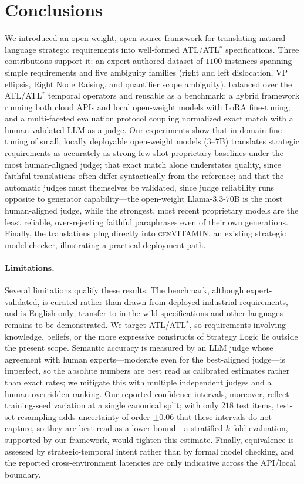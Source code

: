 \section{Conclusions}
\label{sec:conclusions}

We introduced an open-weight, open-source framework for translating natural-language strategic requirements into well-formed ATL/ATL$^\ast$ specifications. Three contributions support it: an expert-authored dataset of $1100$ instances spanning simple requirements and five ambiguity families (right and left dislocation, VP ellipsis, Right Node Raising, and quantifier scope ambiguity), balanced over the ATL/ATL$^\ast$ temporal operators and reusable as a benchmark; a hybrid framework running both cloud APIs and local open-weight models with LoRA fine-tuning; and a multi-faceted evaluation protocol coupling normalized exact match with a human-validated LLM-as-a-judge. Our experiments show that in-domain fine-tuning of small, locally deployable open-weight models ($3$--$7$B) translates strategic requirements as accurately as strong few-shot proprietary baselines under the most human-aligned judge; that exact match alone understates quality, since faithful translations often differ syntactically from the reference; and that the automatic judges must themselves be validated, since judge reliability runs opposite to generator capability---the open-weight Llama-3.3-70B is the most human-aligned judge, while the strongest, most recent proprietary models are the least reliable, over-rejecting faithful paraphrases even of their own generations. Finally, the translations plug directly into \textsc{genVITAMIN}, an existing strategic model checker, illustrating a practical deployment path.



\paragraph{Limitations.}
Several limitations qualify these results. The benchmark, although expert-validated, is curated rather than drawn from deployed industrial requirements, and is English-only; transfer to in-the-wild specifications and other languages remains to be demonstrated. We target ATL/ATL$^\ast$, so requirements involving knowledge, beliefs, or the more expressive constructs of Strategy Logic lie outside the present scope. Semantic accuracy is measured by an LLM judge whose agreement with human experts---moderate even for the best-aligned judge---is imperfect, so the absolute numbers are best read as calibrated estimates rather than exact rates; we mitigate this with multiple independent judges and a human-overridden ranking. Our reported confidence intervals, moreover, reflect training-seed variation at a single canonical split; with only $218$ test items, test-set resampling adds uncertainty of order $\pm0.06$ that these intervals do not capture, so they are best read as a lower bound---a stratified $k$-fold evaluation, supported by our framework, would tighten this estimate. Finally, equivalence is assessed by strategic-temporal intent rather than by formal model checking, and the reported cross-environment latencies are only indicative across the API/local boundary.

